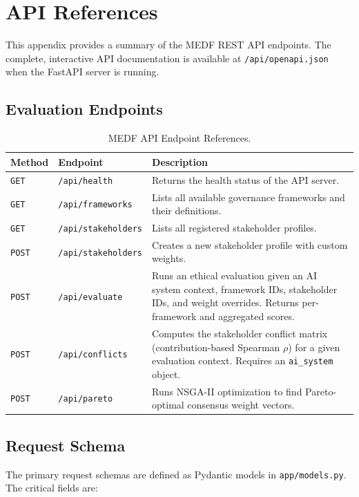 \chapter{API References}
\label{app:api}

This appendix provides a summary of the MEDF REST API endpoints. The complete, interactive API documentation is available at \texttt{/api/openapi.json} when the FastAPI server is running.

\section{Evaluation Endpoints}

\begin{table}[H]
\centering
\caption{MEDF API Endpoint References.}
\label{tab:api_ref}
\begin{tabularx}{\textwidth}{@{}llX@{}}
\toprule
\textbf{Method} & \textbf{Endpoint} & \textbf{Description} \\
\midrule
\texttt{GET}  & \texttt{/api/health} & Returns the health status of the API server. \\
\texttt{GET}  & \texttt{/api/frameworks} & Lists all available governance frameworks and their definitions. \\
\texttt{GET}  & \texttt{/api/stakeholders} & Lists all registered stakeholder profiles. \\
\texttt{POST} & \texttt{/api/stakeholders} & Creates a new stakeholder profile with custom weights. \\
\texttt{POST} & \texttt{/api/evaluate} & Runs an ethical evaluation given an AI system context, framework IDs, stakeholder IDs, and weight overrides. Returns per-framework and aggregated scores. \\
\texttt{POST} & \texttt{/api/conflicts} & Computes the stakeholder conflict matrix (contribution-based Spearman $\rho$) for a given evaluation context. Requires an \texttt{ai\_system} object. \\
\texttt{POST} & \texttt{/api/pareto} & Runs NSGA-II optimization to find Pareto-optimal consensus weight vectors. \\
\bottomrule
\end{tabularx}
\end{table}

\section{Request Schema}

The primary request schemas are defined as Pydantic models in \texttt{app/models.py}. The critical fields are:


